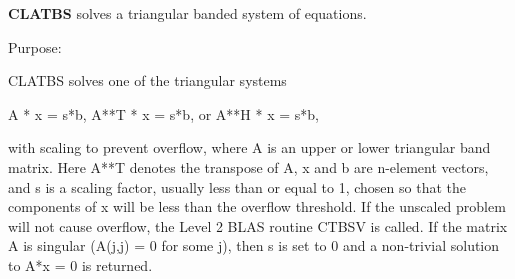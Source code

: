 {\bfseries C\+L\+A\+T\+B\+S} solves a triangular banded system of equations. 

 \begin{DoxyParagraph}{Purpose\+: }
\begin{DoxyVerb} CLATBS solves one of the triangular systems

    A * x = s*b,  A**T * x = s*b,  or  A**H * x = s*b,

 with scaling to prevent overflow, where A is an upper or lower
 triangular band matrix.  Here A**T denotes the transpose of A, x and b
 are n-element vectors, and s is a scaling factor, usually less than
 or equal to 1, chosen so that the components of x will be less than
 the overflow threshold.  If the unscaled problem will not cause
 overflow, the Level 2 BLAS routine CTBSV is called.  If the matrix A
 is singular (A(j,j) = 0 for some j), then s is set to 0 and a
 non-trivial solution to A*x = 0 is returned.\end{DoxyVerb}
 
\end{DoxyParagraph}

